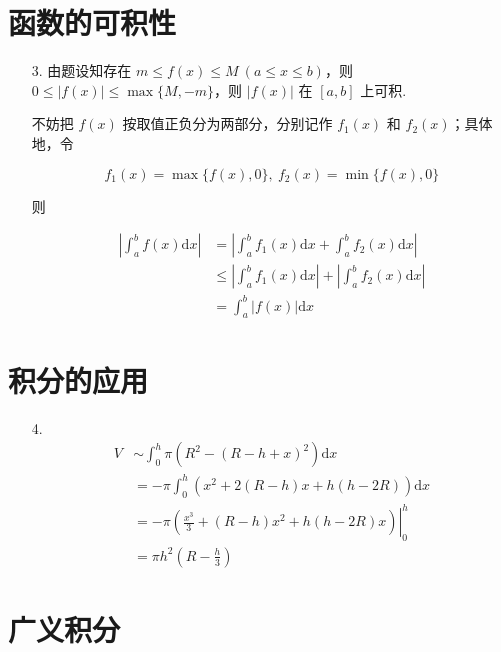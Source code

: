 \documentclass[oneside]{ctexbook} %
\begin{document}
\section{函数的可积性}

\begin{enumerate}
    \item[3.]
    由题设知存在 $m \leqslant f(x) \leqslant M \ (a \leqslant x \leqslant b)$，则 $0 \leqslant |f(x)| \leqslant \max\{ M, -m \}$，则 $|f(x)|$ 在 $[a, b]$ 上可积.
    
    不妨把 $f(x)$ 按取值正负分为两部分，分别记作 $f_1(x)$ 和 $f_2(x)$；具体地，令
    
    $$
    f_1(x) = \max\{ f(x), 0 \},\ f_2(x) = \min\{ f(x), 0 \}
    $$
    
    则
    
    $$
    \begin{aligned}
        \left| \int_a^b f(x) \mathrm dx \right| &= \left| \int_a^b f_1(x) \mathrm dx + \int_a^b f_2(x) \mathrm dx \right| \\ &\leqslant \left| \int_a^b f_1(x) \mathrm dx \right| + \left| \int_a^b f_2(x) \mathrm dx \right| \\
        &= \int_a^b |f(x)| \mathrm dx
    \end{aligned}
    $$
\end{enumerate}

\section{积分的应用}

\begin{enumerate}
    \item[4.]
    $$
    \begin{aligned}
        V &\sim \int_0^h \pi \left( R^2 - (R-h+x)^2 \right)  \mathrm dx \\
        &= -\pi \int_0^h \left( x^2 + 2 (R-h) x + h (h-2R) \right) \mathrm dx \\
        &= \left. -\pi \left( \frac {x^3} 3 + (R-h) x^2 +  h(h-2R)x \right) \right|_0^h \\
        &= \pi h^2 (R - \frac h 3)
    \end{aligned}
    $$
\end{enumerate}

\section{广义积分}
\end{document}
